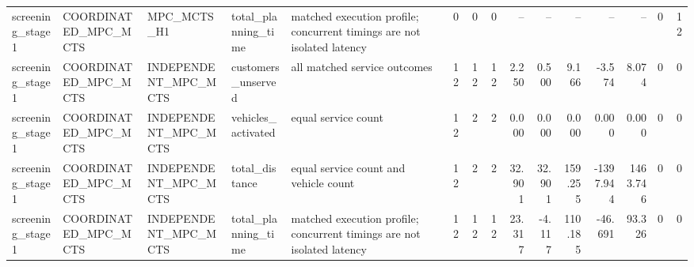 \begin{table}
{\begin{tabular}{lllllrrrrrrrrrr}
screening\_stage1 & COORDINATED\_MPC\_MCTS & MPC\_MCTS\_H1 & total\_planning\_time & matched execution profile; concurrent timings are not isolated latency & 0 & 0 & 0 & -- & -- & -- & -- & -- & 0 & 12 \\
screening\_stage1 & COORDINATED\_MPC\_MCTS & INDEPENDENT\_MPC\_MCTS & customers\_unserved & all matched service outcomes & 12 & 12 & 12 & 2.250 & 0.500 & 9.166 & -3.574 & 8.074 & 0 & 0 \\
screening\_stage1 & COORDINATED\_MPC\_MCTS & INDEPENDENT\_MPC\_MCTS & vehicles\_activated & equal service count & 12 & 2 & 2 & 0.000 & 0.000 & 0.000 & 0.000 & 0.000 & 0 & 0 \\
screening\_stage1 & COORDINATED\_MPC\_MCTS & INDEPENDENT\_MPC\_MCTS & total\_distance & equal service count and vehicle count & 12 & 2 & 2 & 32.901 & 32.901 & 159.255 & -1397.944 & 1463.746 & 0 & 0 \\
screening\_stage1 & COORDINATED\_MPC\_MCTS & INDEPENDENT\_MPC\_MCTS & total\_planning\_time & matched execution profile; concurrent timings are not isolated latency & 12 & 12 & 12 & 23.317 & -4.117 & 110.185 & -46.691 & 93.326 & 0 & 0 \\
\bottomrule
\end{tabular}
}
\end{table}
